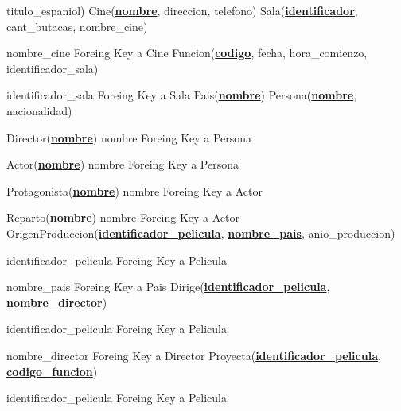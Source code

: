 \documentclass[15pt]{article}
\begin{document}
titulo\_espaniol)
\newline
Cine(\underline{\textbf{nombre}}, direccion, telefono)
\newline
Sala(\underline{\textbf{identificador}}, cant\_butacas, nombre\_cine)

\hspace{1cm} nombre\_cine Foreing Key a Cine
\newline
Funcion(\underline{\textbf{codigo}}, fecha, hora\_comienzo, identificador\_sala)

\hspace{1cm} identificador\_sala Foreing Key a Sala
\newline
Pais(\underline{\textbf{nombre}})
\newline
Persona(\underline{\textbf{nombre}}, nacionalidad)

\hspace{1cm} Director(\underline{\textbf{nombre}})  nombre  Foreing Key a Persona
    
\hspace{1cm} Actor(\underline{\textbf{nombre}})   nombre  Foreing Key a Persona
    
\hspace{2cm} Protagonista(\underline{\textbf{nombre}})    nombre  Foreing Key a Actor
        
\hspace{2cm} Reparto(\underline{\textbf{nombre}}) nombre  Foreing Key a Actor
\newline
\newline
OrigenProduccion(\underline{\textbf{identificador\_pelicula}}, \underline{\textbf{nombre\_pais}}, anio\_produccion)

\hspace{1cm} identificador\_pelicula	Foreing Key a Pelicula

\hspace{1cm} nombre\_pais	Foreing Key a Pais
\newline
Dirige(\underline{\textbf{identificador\_pelicula}}, \underline{\textbf{nombre\_director}})

\hspace{1cm} identificador\_pelicula	Foreing Key a Pelicula
    
\hspace{1cm} nombre\_director	Foreing Key a Director
\newline
Proyecta(\underline{\textbf{identificador\_pelicula}}, \underline{\textbf{codigo\_funcion}})

\hspace{1cm} identificador\_pelicula	Foreing Key a Pelicula
    
\end{document}
